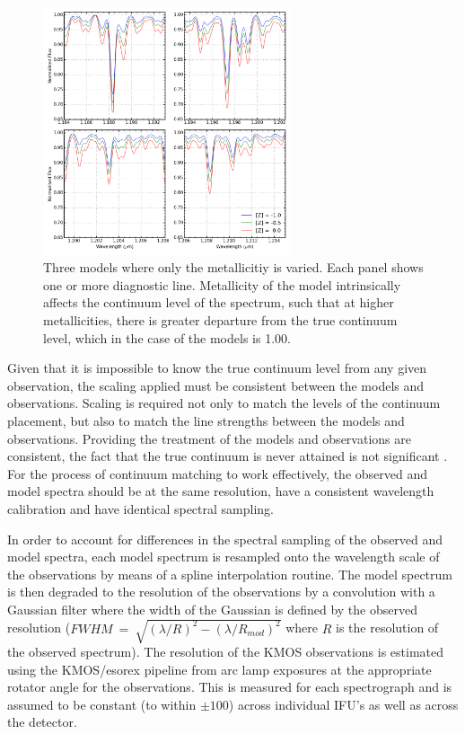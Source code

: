 \begin{figure}
 \centering
\includegraphics[width=0.65\textwidth]{JAnal/varyZ}
\caption{
Three models where only the metallicitiy is varied.
Each panel shows one or more diagnostic line.
Metallicity of the model intrinsically affects the continuum level of the spectrum,
such that at higher metallicities, there is greater departure from the true continuum level, which in the case of the models is 1.00.\label{fig:mod-zcont}
         }
\end{figure}


Given that it is impossible to know the true continuum level from any given observation,
the scaling applied must be consistent between the models and observations.
Scaling is required not only to match the levels of the continuum placement, but also to match the line strengths between the models and observations.
Providing the treatment of the models and observations are consistent, the fact that the true continuum is never attained is not significant
\citep{2014ApJ...788...58G}.
For the process of continuum matching to work effectively,
the observed and model spectra should be at the same resolution,
have a consistent wavelength calibration
and have identical spectral sampling.

In order to account for differences in the spectral sampling of the observed and model spectra,
each model spectrum is resampled onto the wavelength scale of the observations by means of a spline interpolation routine.
The model spectrum is then degraded to the resolution of the observations by a
convolution with a Gaussian filter where the width of the Gaussian is defined by the observed resolution ($FWHM~=~\sqrt{(\lambda/R)^{2} -(\lambda/R_{mod})^{2}}$ where $R$ is the resolution of the observed spectrum).
The resolution of the KMOS observations is estimated using the KMOS/esorex pipeline from arc lamp exposures at the appropriate rotator angle for the observations.
This is measured for each spectrograph and is assumed to be constant (to within $\pm 100$) across individual IFU's as well as across the detector.

